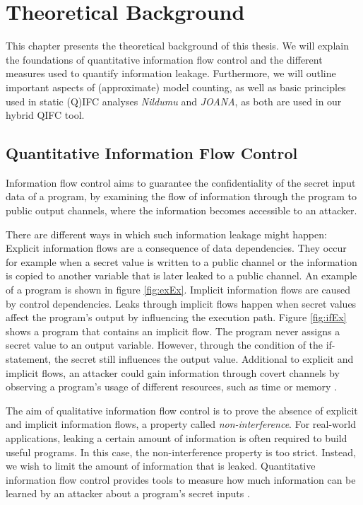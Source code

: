 \chapter{Theoretical Background}\label{sec:basics}

This chapter presents the theoretical background of this thesis. We will explain the foundations of quantitative information flow control and the different measures used to quantify information leakage. Furthermore, we will outline important aspects of (approximate) model counting, as well as basic principles used in static (Q)IFC analyses \emph{Nildumu} and \emph{JOANA}, as both are used in our hybrid QIFC tool.

\section{Quantitative Information Flow Control}

Information flow control aims to guarantee the confidentiality of the secret input data of a program, by examining the flow of information through the program to public output channels, where the information becomes accessible to an attacker.

There are different ways in which such information leakage might happen: Explicit information flows are a consequence of data dependencies. They occur for example when a secret value is written to a public channel or the information is copied to another variable that is later leaked to a public channel. An example of a program is shown in figure \ref{fig:exEx}. Implicit information flows are caused by control dependencies. Leaks through implicit flows happen when secret values affect the program's output by influencing the execution path. Figure \ref{fig:ifEx} shows a program that contains an implicit flow. The program never assigns a secret value to an output variable. However, through the condition of the if-statement, the secret still influences the output value. 
Additional to explicit and implicit flows, an attacker could gain information through covert channels by observing a program's usage of different resources, such as time or memory \cite{smith07}.

The aim of qualitative information flow control is to prove the absence of explicit and implicit information flows, a property called \emph{non-interference}. For real-world applications, leaking a certain amount of information is often required to build useful programs. In this case, the non-interference property is too strict. Instead, we wish to limit the amount of information that is leaked. Quantitative information flow control provides tools to measure how much information can be learned by an attacker about a program's secret inputs \cite{smith09}.

